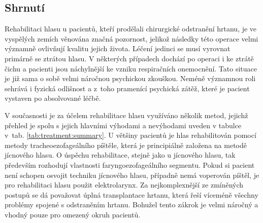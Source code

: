 %


\subsection{Shrnutí} %


Rehabilitaci hlasu u pacientů, kteří prodělali chirurgické odstranění hrtanu, je ve
vyspělých zemích věnována značná pozornost, jelikož následky této operace velmi významně ovlivňují kvalitu jejich života. Léčení jedinci se musí vyrovnat primárně se ztrátou hlasu. V některých případech dochází po operaci i ke ztrátě čichu a pacienti jsou náchylnější ke vzniku respiračních onemocnění.
Tato situace je již sama o sobě velmi náročnou psychickou zkouškou. Neméně významnou
roli sehrává i fyzická odlišnost a z~toho pramenící psychická zátěž, které je pacient vystaven
po absolvované léčbě.

 V současnosti je za účelem rehabilitace hlasu využíváno několik metod, jejichž přehled je spolu s jejich hlavními výhodami a nevýhodami uveden v tabulce v~tab. \ref{tab:treatment:summary}.
U většiny pacientů je hlas rehabilitován pomocí metody tracheoezofageálního píštěle,
která je principiálně založena na metodě jícnového hlasu. O úspěchu rehabilitace, stejně jako u jícnového hlasu, tak
především rozhodují vlastnosti faryngoezofageálního segmentu. Pokud si pacient
není schopen osvojit techniku jícnového hlasu, případně nemá voperován píštěl, je
pro rehabilitaci hlasu použit elektrolarynx. Za nejkomplexnější ze zmíněných postupů se dá považovat úplná transplantace hrtanu, která
řeší víceméně všechny problémy spojené s odstraněním hrtanu. Bohužel tento
zákrok je velmi náročný a vhodný pouze pro omezený okruh pacientů.


